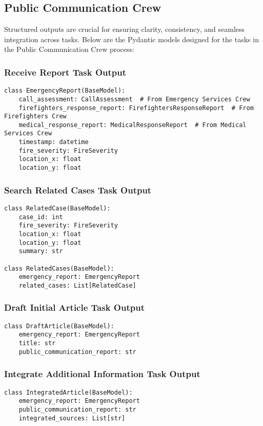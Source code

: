 \subsection{Public Communication Crew}

Structured outputs are crucial for ensuring clarity, consistency, and seamless integration across tasks. Below are the Pydantic models designed for the tasks in the Public Communication Crew process:

\subsubsection{Receive Report Task Output}
\begin{lstlisting}[caption={Pydantic model for Receive Report Task Output}]
class EmergencyReport(BaseModel):
    call_assessment: CallAssessment  # From Emergency Services Crew
    firefighters_response_report: FirefightersResponseReport  # From Firefighters Crew
    medical_response_report: MedicalResponseReport  # From Medical Services Crew
    timestamp: datetime
    fire_severity: FireSeverity
    location_x: float
    location_y: float
\end{lstlisting}

\subsubsection{Search Related Cases Task Output}
\begin{lstlisting}[caption={Pydantic model for Search Related Cases Task Output}]
class RelatedCase(BaseModel):
    case_id: int
    fire_severity: FireSeverity
    location_x: float
    location_y: float
    summary: str

class RelatedCases(BaseModel):
    emergency_report: EmergencyReport
    related_cases: List[RelatedCase]
\end{lstlisting}

\subsubsection{Draft Initial Article Task Output}
\begin{lstlisting}[caption={Pydantic model for Draft Initial Article Task Output}]
class DraftArticle(BaseModel):
    emergency_report: EmergencyReport
    title: str
    public_communication_report: str
\end{lstlisting}

\subsubsection{Integrate Additional Information Task Output}
\begin{lstlisting}[caption={Pydantic model for Integrate Additional Information Task Output}]
class IntegratedArticle(BaseModel):
    emergency_report: EmergencyReport
    public_communication_report: str
    integrated_sources: List[str]
\end{lstlisting}


